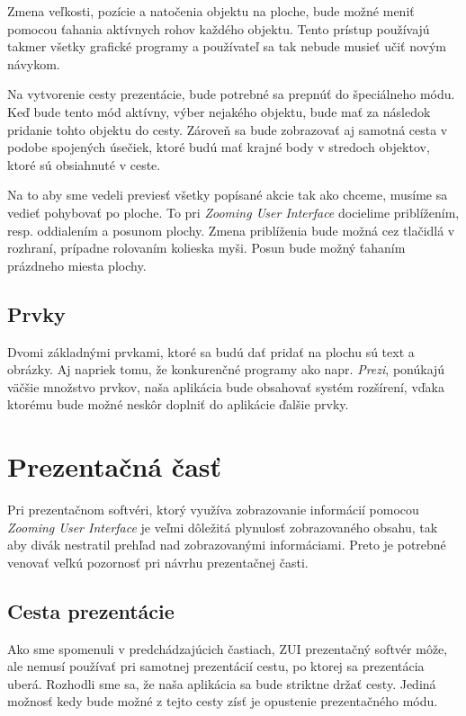 Zmena veľkosti, pozície a natočenia objektu na ploche, bude možné meniť pomocou ťahania aktívnych rohov každého objektu. Tento prístup používajú takmer všetky grafické programy a používateľ sa tak nebude musieť učiť novým návykom.

Na vytvorenie cesty prezentácie, bude potrebné sa prepnúť do špeciálneho módu. Keď bude tento mód aktívny, výber nejakého objektu, bude mať za následok pridanie tohto objektu do cesty. Zároveň sa bude zobrazovať aj samotná cesta v podobe spojených úsečiek, ktoré budú mať krajné body v stredoch objektov, ktoré sú obsiahnuté v ceste.

Na to aby sme vedeli previesť všetky popísané akcie tak ako chceme, musíme sa vedieť pohybovať po ploche. To pri \textit{Zooming User Interface} docielime priblížením, resp. oddialením a posunom plochy. Zmena priblíženia bude možná cez tlačidlá v rozhraní, prípadne rolovaním kolieska myši. Posun bude možný ťahaním prázdneho miesta plochy.

\subsection{Prvky}

Dvomi základnými prvkami, ktoré sa budú dať pridať na plochu sú text a obrázky. Aj napriek tomu, že konkurenčné programy ako napr. \textit{Prezi}, ponúkajú väčšie množstvo prvkov, naša aplikácia bude obsahovať systém rozšírení, vďaka ktorému bude možné neskôr doplniť do aplikácie ďalšie prvky.

\section{Prezentačná časť}

Pri prezentačnom softvéri, ktorý využíva zobrazovanie informácií pomocou \textit{Zooming User Interface} je veľmi dôležitá plynulosť zobrazovaného obsahu, tak aby divák nestratil prehľad nad zobrazovanými informáciami. Preto je potrebné venovať veľkú pozornosť pri návrhu prezentačnej časti.

\subsection{Cesta prezentácie}

Ako sme spomenuli v predchádzajúcich častiach, ZUI prezentačný softvér môže, ale nemusí používať pri samotnej prezentácií cestu, po ktorej sa prezentácia uberá. Rozhodli sme sa, že naša aplikácia sa bude striktne držať cesty. Jediná možnosť kedy bude možné z tejto cesty zísť je opustenie prezentačného módu.

